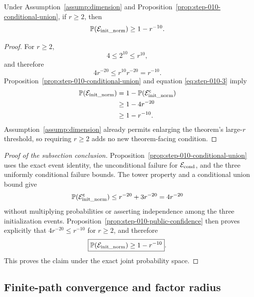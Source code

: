 \begin{proposition}
\label{prop:step-010-public-confidence}
Under Assumption~\ref{assump:dimension} and
Proposition~\ref{prop:step-010-conditional-union}, if \(r\ge2\), then
\[
  \mathbb P(\mathcal E_{\rm init\_norm})\ge1-r^{-10}.
\]

\end{proposition}

\begin{proof}
For \(r\ge2\),
\[
  4\le2^{10}\le r^{10},
\]
and therefore
\begin{equation}
  4r^{-20}\le r^{10}r^{-20}=r^{-10}.                     \label{eq:step-010-3}
\end{equation}
Proposition~\ref{prop:step-010-conditional-union} and equation \eqref{eq:step-010-3} imply
\[
\begin{aligned}
  \mathbb P(\mathcal E_{\rm init\_norm})
  &=1-\mathbb P(\mathcal E_{\rm init\_norm}^{\mathsf c})\\
  &\ge1-4r^{-20}\\
  &\ge1-r^{-10}.
\end{aligned}
\]
Assumption~\ref{assump:dimension} already permits enlarging the theorem's
large-\(r\) threshold, so requiring \(r\ge2\) adds no new theorem-facing
condition. 

\end{proof}

\begin{proof}[Proof of the subsection conclusion]

Proposition~\ref{prop:step-010-conditional-union} uses the exact event
identity, the unconditional failure for \(\mathcal E_{\rm cond}\),
and the three uniformly conditional failure bounds. The tower
property and a conditional union bound give
\[
  \mathbb P(\mathcal E_{\rm init\_norm}^{\mathsf c})
  \le r^{-20}+3r^{-20}=4r^{-20}
\]
without multiplying probabilities or asserting independence among the three
initialization events. Proposition~\ref{prop:step-010-public-confidence}
then proves explicitly that \(4r^{-20}\le r^{-10}\) for \(r\ge2\), and
therefore
\[
  \boxed{\mathbb P(\mathcal E_{\rm init\_norm})\ge1-r^{-10}}.
\]
This proves the claim under the exact joint probability space.

\end{proof}

\subsection{Finite-path convergence and factor radius}\label{app:step-011}

